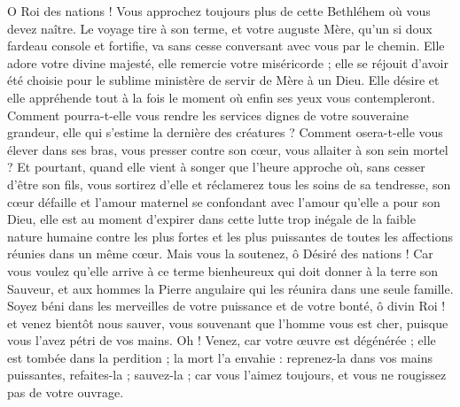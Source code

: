 \documentclass[%
fontsize=10%
,a6paper%
,DIV=13%
]{scrartcl}
\begin{document}
O Roi des nations ! Vous approchez toujours plus de cette Bethléhem où vous devez naître. Le voyage tire à son terme, et votre auguste Mère, qu’un si doux fardeau console et fortifie, va sans cesse conversant avec vous par le chemin. Elle adore votre divine majesté, elle remercie votre miséricorde ; elle se réjouit d’avoir été choisie pour le sublime ministère de servir de Mère à un Dieu. Elle désire et elle appréhende tout à la fois le moment où enfin ses yeux vous contempleront. Comment pourra-t-elle vous rendre les services dignes de votre souveraine grandeur, elle qui s’estime la dernière des créatures ? Comment osera-t-elle vous élever dans ses bras, vous presser contre son cœur, vous allaiter à son sein mortel ? Et pourtant, quand elle vient à songer que l’heure approche où, sans cesser d’être son fils, vous sortirez d’elle et réclamerez tous les soins de sa tendresse, son cœur défaille et l’amour maternel se confondant avec l’amour qu’elle a pour son Dieu, elle est au moment d’expirer dans cette lutte trop inégale de la faible nature humaine contre les plus fortes et les plus puissantes de toutes les affections réunies dans un même cœur. Mais vous la soutenez, ô Désiré des nations ! Car vous voulez qu’elle arrive à ce terme bienheureux qui doit donner à la terre son Sauveur, et aux hommes la Pierre angulaire qui les réunira dans une seule famille. Soyez béni dans les merveilles de votre puissance et de votre bonté, ô divin Roi ! et venez bientôt nous sauver, vous souvenant que l’homme vous est cher, puisque vous l’avez pétri de vos mains. Oh ! Venez, car votre œuvre est dégénérée ; elle est tombée dans la perdition ; la mort l’a envahie : reprenez-la dans vos mains puissantes, refaites-la ; sauvez-la ; car vous l’aimez toujours, et vous ne rougissez pas de votre ouvrage.

\end{document}
